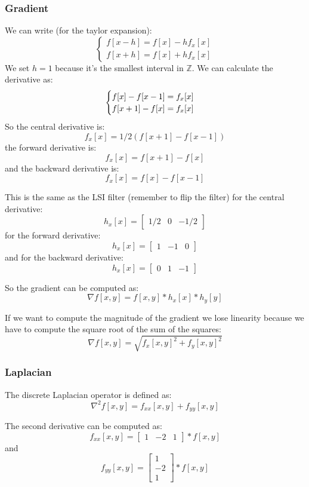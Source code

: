 \subsubsection{Gradient}
\label{sec:gradient}

We can write (for the taylor expansion):
\[
    \begin{cases}
        f[x-h]=f[x]-hf_x[x] \\
        f[x+h]=f[x]+hf_x[x]
    \end{cases}
\]
We set $h=1$ because it's the smallest interval in $\mathbb{Z}$.
We can calculate the derivative as:
\[
    \begin{cases}
        f[x]-f[x-1]=f_x[x] \\
        f[x+1]-f[x]=f_x[x]
    \end{cases} \\
\]
So the central derivative is:
\[
    f_x[x]=1/2(f[x+1]-f[x-1])
\]
the forward derivative is:
\[
    f_x[x]=f[x+1]-f[x]
\]
and the backward derivative is:
\[
    f_x[x]=f[x]-f[x-1]
\]

This is the same as the LSI filter
(remember to flip the filter)
for the central derivative:
\[
    h_x[x]=\begin{bmatrix}
        1/2 & 0 & -1/2
    \end{bmatrix}
\]
for the forward derivative:
\[
    h_x[x]=\begin{bmatrix}
        1 & -1 & 0
    \end{bmatrix}
\]
and for the backward derivative:
\[
    h_x[x]=\begin{bmatrix}
        0 & 1 & -1
    \end{bmatrix}
\]

So the gradient can be computed as:
\[
    \nabla f[x,y]=f[x,y]*h_x[x]*h_y[y]
\]

If we want to compute the magnitude of the gradient
we lose linearity because we have to compute the square root 
of the sum of the squares:
\[
    \nabla f[x,y]=\sqrt{f_x[x,y]^2+f_y[x,y]^2}
\]

\subsubsection{Laplacian}
\label{sec:laplacian}

The discrete Laplacian operator is defined as:
\[
    \nabla^2 f[x,y]=f_{xx}[x,y]+f_{yy}[x,y]
\]

The second derivative can be computed as:
\[
    f_{xx}[x,y]=\begin{bmatrix}
        1 & -2 & 1
    \end{bmatrix} * f[x,y]
\]
and
\[
    f_{yy}[x,y]=\begin{bmatrix}
        1 \\
        -2 \\
        1
    \end{bmatrix} * f[x,y]
\]

